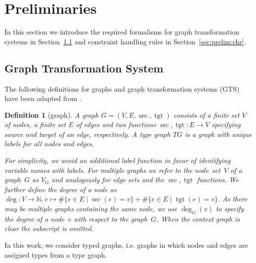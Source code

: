 \documentclass{tlp}
\newtheorem{definition}{Definition}[section]
\DeclareMathOperator{\src}{src}
\DeclareMathOperator{\tgt}{tgt}
\begin{document}
\section{Preliminaries}
\label{sec:preliminaries}

In this section we introduce the required formalisms for graph transformation
systems in Section~\ref{sec:prelim:gts} and constraint handling rules in
Section~\ref{sec:prelim:chr}.

\subsection{Graph Transformation System}
\label{sec:prelim:gts}

The following definitions for graphs and graph transformation systems (GTS) have
been adapted from \cite{ehrigprangetaentzer06}.

\begin{definition}[graph] A \emph{graph} $G = (V, E, \src,
\tgt)$ consists of a finite set $V$ of nodes, a finite set $E$ of edges and two
functions $\src, \tgt: E \rightarrow V$ specifying source and target of an edge,
respectively. A \emph{type graph} $TG$ is a graph with unique labels for all
nodes and edges.

For simplicity, we avoid an additional label function in favor of identifying
variable names with labels. For multiple graphs we refer to the node~set~$V$ of a
graph~$G$ as $V_G$ and analogously for edge sets and the $\src, \tgt$ functions.
We further define the degree of a node as $\deg : V \rightarrow \mathbb{N}, v
\mapsto \#\{ e \in E \mid \src(e) = v \} + \#\{ e \in E \mid \tgt(e) = v \}$. As
there may be multiple graphs containing the same node, we use $\deg_G(v)$ to
specify the degree of a node~$v$ with respect to the graph~$G$. When the context
graph is clear the subscript is omitted.
\end{definition}

In this work, we consider typed graphs, i.e. graphs in which nodes and edges are
assigned types from a type graph.
\end{document}
